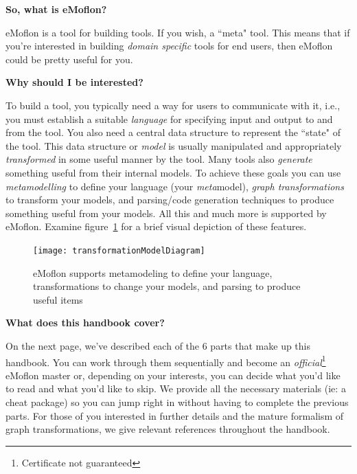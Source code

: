 {\bf \large So, what is eMoflon?}

eMoflon is a tool for building tools. If you wish, a ``meta" tool.  This means that if you're interested in building \emph{domain specific} tools for end users,
then eMoflon could be pretty useful for you.


{\bf \large Why should I be interested?}

To build a tool, you typically need a way for users to communicate with it, i.e., you must establish a suitable \emph{language} for specifying input and output
to and from the tool.  You also need a central data structure to represent the ``state" of the tool.  This data structure or \emph{model} is usually manipulated
and appropriately \emph{transformed} in some useful manner by the tool.  Many tools also \emph{generate} something useful from their internal models. To achieve
these goals you can use \emph{metamodelling} to define your language (your \emph{meta}model), \emph{graph transformations} to transform your models, and
parsing/code generation techniques to produce something useful from your models. All this and much more is supported by eMoflon. Examine
figure~\ref{fig:transModel} for a brief visual depiction of these features.

\begin{figure}[htbp]
	\centering
  \texttt{[image: transformationModelDiagram]}
	\caption{eMoflon supports metamodeling to define your language, transformations to change your models, and parsing to produce useful items}
	\label{fig:transModel}
\end{figure}

{\bf \large What does this handbook cover?}

On the next page, we've described each of the 6 parts that make up this handbook. You can work through them sequentially and become an
\emph{official}\footnote{Certificate not guaranteed} eMoflon master or, depending on your interests, you can decide what you'd like to read and what you'd like
to skip. We provide all the necessary materials (ie: a cheat package) so you can jump right in without having to complete the previous parts. For those of you
interested in further details and the mature formalism of graph transformations, we give relevant references throughout the handbook.

\vfill \pagebreak

